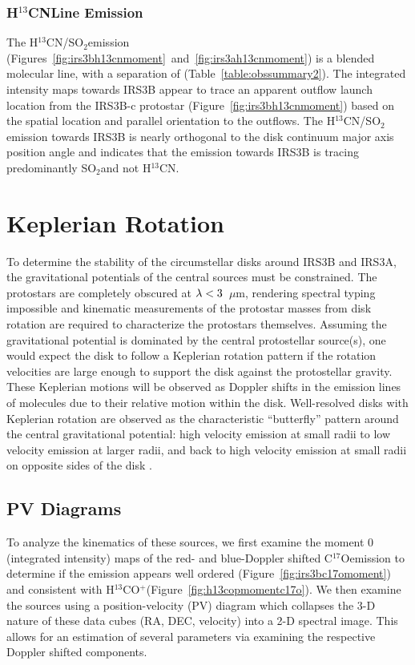 \documentclass[twocolumn, 12pt,trackchanges]{aastex63}
\newcommand{\htcn}{H$^{13}$CN}
\newcommand{\cso}{C$^{17}$O}
\newcommand{\htcop}{H$^{13}$CO$^+$}
\newcommand{\sot}{SO$_{2}$}
\renewcommand{\micron}{$\mu$m}
\newcommand{\kms}{km~s$^{-1}$}
\begin{document}
\subsubsection{\htcn\space Line Emission}\label{sec:htcnemission}
The \htcn/\sot\space emission (Figures~\ref{fig:irs3bh13cnmoment}~and~\ref{fig:irs3ah13cnmoment}) is a blended molecular line, with a separation of \deleted{1\kms}\added{1~\kms}\space(Table~\ref{table:obssummary2}). The integrated intensity maps towards IRS3B appear to trace an apparent outflow launch location from the IRS3B-c protostar (Figure~\ref{fig:irs3bh13cnmoment}) based on the spatial location and parallel orientation to the outflows. The \htcn/\sot\space emission towards IRS3B is nearly orthogonal to the disk continuum major axis position angle and indicates that the emission towards IRS3B is tracing predominantly \sot\space and not \htcn.

\section{Keplerian Rotation}\label{sec:keprotation}

To determine the stability of the circumstellar disks around IRS3B and IRS3A, the gravitational potentials of the central sources must be constrained. The protostars are completely obscured at $\lambda\space<\space3$~\micron, rendering spectral typing impossible and kinematic measurements of the protostar masses from disk rotation are required to characterize the protostars themselves. Assuming the gravitational potential is dominated by the central protostellar source(s), one would expect the disk to follow a Keplerian rotation pattern if the rotation velocities are large enough to support the disk against the protostellar gravity. These Keplerian motions will be observed as Doppler shifts in the emission lines of molecules due to their relative motion within the disk. Well-resolved disks with Keplerian rotation are observed as the characteristic ``butterfly'' pattern around the central gravitational potential: high velocity emission at small radii to low velocity emission at larger radii, and back to high velocity emission at small radii on opposite sides of the disk \citep[e.g., ][]{2013ApJ...774...16R, 2018AA...609A..47P}.

\subsection{PV Diagrams}
To analyze the kinematics of these sources, we first examine the moment 0 (integrated intensity) maps of the red- and blue-Doppler shifted \cso\space emission to determine if the emission appears well ordered (Figure~\ref{fig:irs3bc17omoment}) and consistent with \htcop\space(Figure~\ref{fig:h13copmomentc17o}). We then examine the sources using a position-velocity (PV) diagram which collapses the 3-D nature of these data cubes (RA, DEC, velocity) into a 2-D spectral image.  This allows for an estimation of several parameters via examining the respective Doppler shifted components. 
\end{document}
